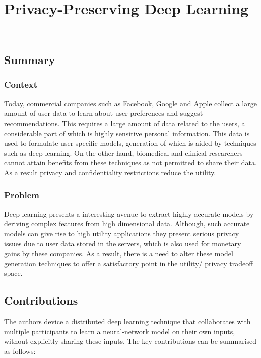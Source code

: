 \newpage
\section{Privacy-Preserving Deep Learning~\cite{Shokri:2015:PDL:2810103.2813687}}~\label{lect5}

\subsection*{Summary} 

\subsubsection*{Context}

Today, commercial companies such as Facebook, Google and Apple collect a large amount of user data to learn 
about user preferences and suggest recommendations. This requires a large amount of data related to the users, 
a considerable part of which is highly sensitive personal information. This data is used to formulate user specific 
models, generation of which is aided by techniques such as deep learning. On the other hand, biomedical and 
clinical researchers cannot attain benefits from these techniques as not permitted to share their data. As 
a result privacy and confidentiality restrictions reduce the utility. 

\subsubsection*{Problem}

Deep learning presents a interesting avenue to extract highly accurate models by deriving complex features from high
dimensional data. Although, such accurate models can give rise to high utility applications they present serious
privacy issues due to user data stored in the servers, which is also used for monetary gains by these companies. As 
a result, there is a need to alter these model generation techniques to offer a satisfactory point in the utility/
privacy tradeoff space. 

\subsection*{Contributions}

The authors device a distributed deep learning technique that collaborates with multiple participants to learn a 
neural-network model on their own inputs, without explicitly sharing these inputs. The key contributions can be 
summarised as follows: 

